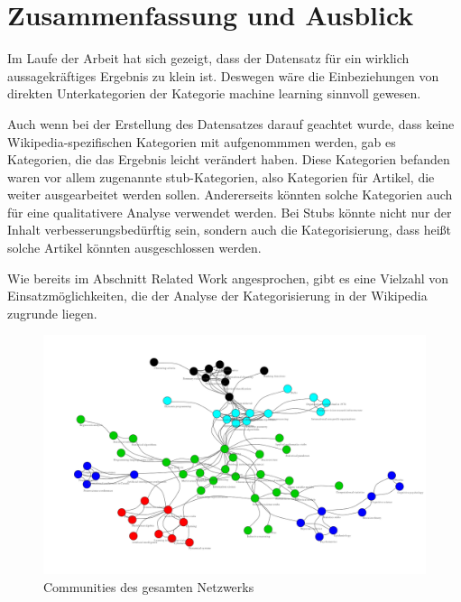 \documentclass{acm_proc_article-sp}
\begin{document}
\section{Zusammenfassung und Ausblick}
Im Laufe der Arbeit hat sich gezeigt, dass der Datensatz für ein wirklich aussagekräftiges Ergebnis zu klein ist. Deswegen wäre die Einbeziehungen von direkten Unterkategorien der Kategorie machine learning sinnvoll gewesen.

Auch wenn bei der Erstellung des Datensatzes darauf geachtet wurde, dass keine Wikipedia-spezifischen Kategorien mit aufgenommmen werden, gab es Kategorien, die das Ergebnis leicht verändert haben. Diese Kategorien befanden waren vor allem zugenannte stub-Kategorien, also Kategorien für Artikel, die weiter ausgearbeitet werden sollen. Andererseits könnten solche Kategorien auch für eine qualitativere Analyse verwendet werden. Bei Stubs könnte nicht nur der Inhalt verbesserungsbedürftig sein, sondern auch die Kategorisierung, dass heißt solche Artikel könnten ausgeschlossen werden.

Wie bereits im Abschnitt Related Work angesprochen, gibt es eine Vielzahl von Einsatzmöglichkeiten, die der Analyse der Kategorisierung in der Wikipedia zugrunde liegen.  \cite{*}


\newpage
\begin{figure}
\centering
\begin{sideways}
\includegraphics[scale=0.5]{../visualization/ml_graph_big.png}
\end{sideways}
\caption{Communities des gesamten Netzwerks}
\label{fig:big}
\end{figure}
\end{document}
